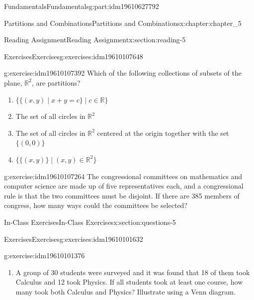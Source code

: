 \documentclass[oneside,10pt,]{book}
\numberwithin{equation}{section}
\begin{document}
\begin{partptx}{Fundamentals}{}{Fundamentals}{}{}{g:part:idm19610627792}
\begin{chapterptx}{Partitions and Combinations}{}{Partitions and Combinations}{}{}{x:chapter:chapter_5}
\begin{sectionptx}{Reading Assignment}{}{Reading Assignment}{}{}{x:section:reading-5}
\begin{exercises-subsection-numberless}{Exercises}{}{Exercises}{}{}{g:exercises:idm19610107648}
%
\begin{exercisegroup}
\begin{divisionexerciseeg}{1}{}{}{g:exercise:idm19610107392}%
Which of the following collections of subsets of the plane, \(\mathbb{R}^2\), are partitions?%
\begin{enumerate}[label=(\alph*)]
\item{}\(\displaystyle \{ \{(x, y) \mid x + y = c \} \mid c \in \mathbb{R} \}\)%
\item{}The set of all circles in \(\mathbb{R}^2 \)%
\item{}The set of all circles in \(\mathbb{R}^2\) centered at the origin together with the set \(\{(0,0)\}\)%
\item{}\(\displaystyle \{\{(x, y)\} \mid (x, y) \in \mathbb{R}^2  \} \)%
\end{enumerate}
%
\end{divisionexerciseeg}%
\begin{divisionexerciseeg}{2}{}{}{g:exercise:idm19610107264}%
The congressional committees on mathematics and computer science are made up of five representatives each, and a congressional rule is that the two committees must be disjoint. If there are 385 members of congress, how many ways could the committees be selected?%
\end{divisionexerciseeg}%
\end{exercisegroup}
\par\medskip\noindent
\end{exercises-subsection-numberless}
\end{sectionptx}
%
%
\typeout{************************************************}
\typeout{************************************************}
%
\begin{sectionptx}{In-Class Exercises}{}{In-Class Exercises}{}{}{x:section:questions-5}
%
%
%
\typeout{************************************************}
\typeout{************************************************}
%
\begin{exercises-subsection-numberless}{Exercises}{}{Exercises}{}{}{g:exercises:idm19610101632}
\par\medskip\noindent%
%
\begin{exercisegroup}
\begin{divisionexerciseeg}{1}{}{}{g:exercise:idm19610101376}%
%
\begin{enumerate}[label=(\alph*)]
\item{}A group of 30 students were surveyed and it was found that 18 of them took Calculus and 12 took Physics. If all students took at least one course, how many took both Calculus and Physics? Illustrate using a Venn diagram.%

\end{enumerate}
\end{divisionexerciseeg}
\end{exercisegroup}
\end{exercises-subsection-numberless}
\end{sectionptx}
\end{chapterptx}
\end{partptx}
\end{document}
